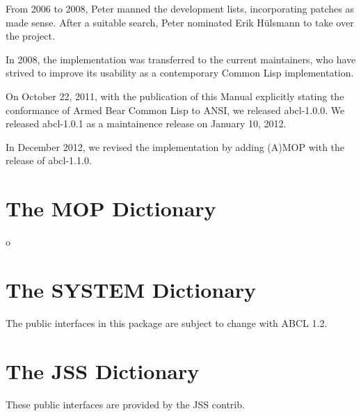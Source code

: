 \documentclass[10pt]{book}
\begin{document}
From 2006 to 2008, Peter manned the development lists, incorporating
patches as made sense.  After a suitable search, Peter nominated Erik
H\"{u}lsmann to take over the project.

In 2008, the implementation was transferred to the current
maintainers, who have strived to improve its usability as a
contemporary Common Lisp implementation.

On October 22, 2011, with the publication of this Manual explicitly
stating the conformance of Armed Bear Common Lisp to \textsc{ANSI}, we
released abcl-1.0.0.  We released abcl-1.0.1 as a maintainence release
on January 10, 2012.

In December 2012, we revised the implementation by adding (A)MOP
with the release of abcl-1.1.0.

\appendix 

\chapter{The MOP Dictionary}

o

\chapter{The SYSTEM Dictionary}

The public interfaces in this package are subject to change with
ABCL 1.2.



\chapter{The JSS Dictionary}

These public interfaces are provided by the JSS contrib.







\printindex
\end{document}
